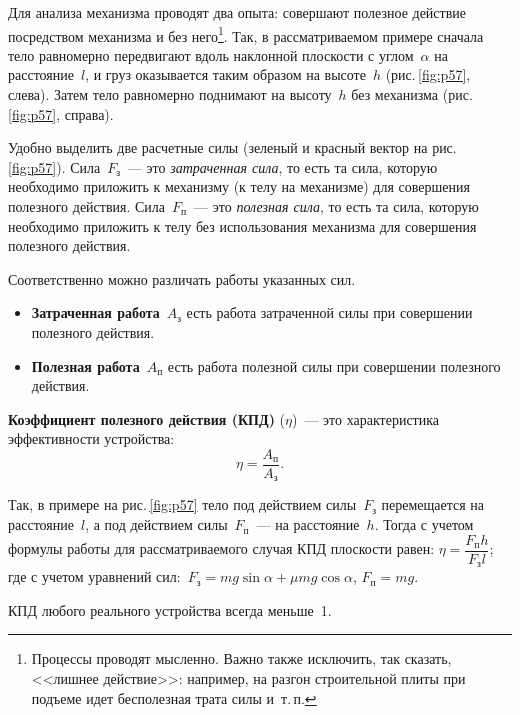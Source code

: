 \documentclass[main.tex]{subfiles}
\begin{document}
Для анализа механизма проводят два опыта: совершают полезное действие посредством механизма и без него\footnote{Процессы проводят мысленно. Важно также исключить, так сказать, <<лишнее действие>>: например, на разгон строительной плиты при подъеме идет бесполезная трата силы и~т.\,п.}. Так, в рассматриваемом примере сначала тело равномерно передвигают вдоль наклонной плоскости с углом~$\alpha$ на расстояние~$l$, и груз оказывается таким образом на высоте~$h$ (рис.\,\ref{fig:p57}, слева). Затем тело равномерно поднимают на высоту~$h$ без механизма (рис.\,\ref{fig:p57}, справа). 

Удобно выделить две расчетные силы (зеленый и красный вектор на рис.\,\ref{fig:p57}). Сила~$F_\text{з}$~--- это \emph{затраченная сила}, то есть та сила, которую необходимо приложить к механизму (к телу на механизме) для совершения полезного действия. Сила~$F_\text{п}$~--- это \emph{полезная сила}, то есть та сила, которую необходимо приложить к телу без использования механизма для совершения полезного действия. 

Соответственно можно различать работы указанных сил.
\begin{itemize}
    \item \textbf{Затраченная работа}~$A_\text{з}$ есть работа затраченной силы при совершении полезного действия.
    \item \textbf{Полезная работа}~$A_\text{п}$ есть работа полезной силы при совершении полезного действия.
\end{itemize}

\textbf{Коэффициент полезного действия (КПД)} ($\eta$)~--- это характеристика эффективности устройства:
\begin{equation}
    \eta=\frac{A_\text{п}}{A_\text{з}}.
\end{equation}


Так, в примере на рис.\,\ref{fig:p57} тело под действием силы~$F_\text{з}$ перемещается на расстояние~$l$, а под действием силы~$F_\text{п}$~--- на расстояние~$h$. Тогда с учетом формулы работы для рассматриваемого случая КПД плоскости равен: $\eta=\dfrac{F_\text{п}h}{F_\text{з}l}$; где с учетом уравнений сил:~$F_\text{з}=mg\sin\alpha+\mu mg\cos\alpha$, $F_\text{п}=mg$.   

КПД любого реального устройства всегда меньше~1.








 
\end{document}
